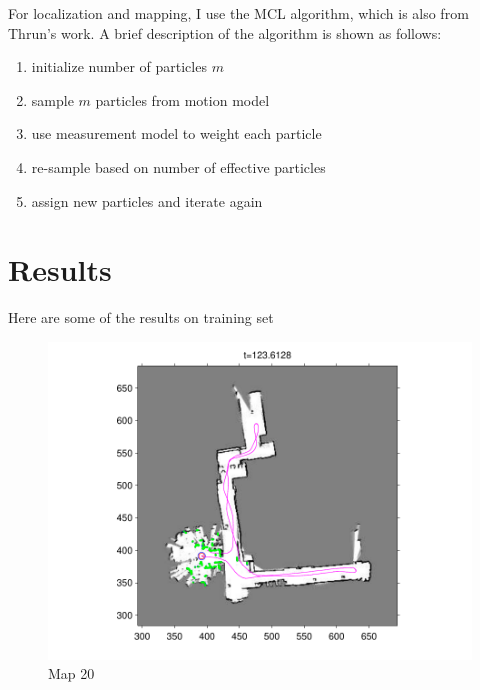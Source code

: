 \documentclass[twoside]{article}
\begin{document}
\begin{multicols}{2}
For localization and mapping, I use the MCL algorithm, which is also from Thrun's work.
A brief description of the algorithm is shown as follows:
\begin{enumerate}
\item initialize number of particles $m$
\item sample $m$ particles from motion model
\item use measurement model to weight each particle
\item re-sample based on number of effective particles
\item assign new particles and iterate again
\end{enumerate}

\section{Results}
Here are some of the results on training set
\begin{figure}[H]
\centering
\includegraphics[width=\columnwidth]{fig/map20.pdf}
\caption{Map 20}
\label{fig:map20}
\end{figure}


\end{multicols}
\end{document}
